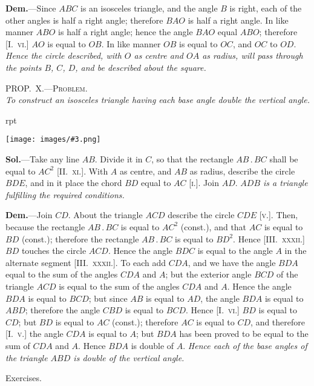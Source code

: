 \documentclass[oneside]{book}
\newcounter{wrapwidth}
\newcommand\myprop[2]{
\bigskip\Needspace*{4\baselineskip}\begin{center}\textsc{#1}\\\medskip\emph{#2}\par\end{center}
}
\newcommand\exhead[1]{
\Needspace*{5\baselineskip}\begin{center}
\textsf{#1}
\end{center}
}
\newcommand\imgflow[3]{
\setcounter{wrapwidth}{#1}
\begin{wrapfigure}[#2]{r}{\value{wrapwidth}pt}
\begin{center}
\vspace{-0.3in}
\texttt{[image: images/\#3.png]}
\end{center}
\end{wrapfigure}
}
\begin{document}
\textbf{Dem.}---Since $ABC$ is an isosceles triangle, and the
angle $B$ is right, each of the other angles is half a right
angle; therefore $BAO$ is half a right angle. In like
manner $ABO$ is half a right angle; hence the angle
$BAO$ equal $ABO$; therefore [\textsc{I.~vi.}] $AO$ is equal to $OB$.
In like manner $OB$ is equal to $OC$, and $OC$ to $OD$.
\emph{Hence the circle described, with $O$ as centre and $OA$ as
radius, will pass through the points $B$, $C$, $D$, and be
described about the square.}

\myprop{PROP\@.~X.---Problem.}{To construct an isosceles triangle having each base angle
double the vertical angle.}

\imgflow{130}{11}{f162}

\textbf{Sol.}---Take any line $AB$. Divide it in $C$, so that the
rectangle $AB\,.\,BC$ shall be equal
to $AC^2$ [\textsc{II\@.~xi.}]. With $A$ as centre,
and $AB$ as radius, describe
the circle $BDE$, and in it place
the chord $BD$ equal to $AC$ [\textsc{i.}].
Join $AD$. \emph{$ADB$ is a triangle fulfilling
the required conditions.}

\textbf{Dem.}---Join $CD$. About the
triangle $ACD$ describe the circle
$CDE$ [\textsc{v.}]. Then, because the
rectangle $AB\,.\,BC$ is equal to
$AC^2$ (const.), and that $AC$ is equal to $BD$ (const.);
therefore the rectangle $AB\,.\,BC$ is equal to $BD^2$. Hence
[\textsc{III\@.~xxxii.}] $BD$ touches the circle $ACD$. Hence the
angle $BDC$ is equal to the angle $A$ in the alternate segment
[\textsc{III\@.~xxxii.}]. To each add $CDA$, and we have the
angle $BDA$ equal to the sum of the angles $CDA$ and $A$;
but the exterior angle $BCD$ of the triangle $ACD$ is
equal to the sum of the angles $CDA$ and $A$. Hence the
angle $BDA$ is equal to $BCD$; but since $AB$ is equal to
$AD$, the angle $BDA$ is equal to $ABD$; therefore the
angle $CBD$ is equal to $BCD$. Hence [\textsc{I.~vi.}] $BD$ is
equal to $CD$; but $BD$ is equal to $AC$ (const.); therefore
$AC$ is equal to $CD$, and therefore [\textsc{I.~v.}] the angle
$CDA$ is equal to $A$; but $BDA$ has been proved to be
equal to the sum of $CDA$ and $A$. Hence $BDA$ is double
of $A$. \textit{Hence each of the base angles of the triangle $ABD$
is double of the vertical angle.}

\exhead{Exercises.}
\end{document}
